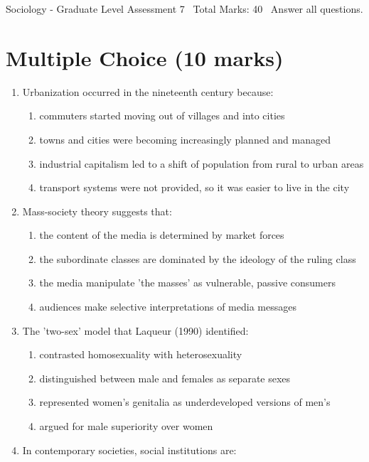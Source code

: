 \documentclass[12pt]{article}
\begin{document}
\begin{center}
Sociology - Graduate Level Assessment 7 \
Total Marks: 40 \
Answer all questions.
\end{center}

\section*{Multiple Choice (10 marks)}
\begin{enumerate}[label=\arabic*.]
\item Urbanization occurred in the nineteenth century because:
\begin{enumerate}[label=(\alph*)]
    \item commuters started moving out of villages and into cities
    \item towns and cities were becoming increasingly planned and managed
    \item industrial capitalism led to a shift of population from rural to urban areas
    \item transport systems were not provided, so it was easier to live in the city
\end{enumerate}
\item Mass-society theory suggests that:
\begin{enumerate}[label=(\alph*)]
    \item the content of the media is determined by market forces
    \item the subordinate classes are dominated by the ideology of the ruling class
    \item the media manipulate 'the masses' as vulnerable, passive consumers
    \item audiences make selective interpretations of media messages
\end{enumerate}
\item The 'two-sex' model that Laqueur (1990) identified:
\begin{enumerate}[label=(\alph*)]
    \item contrasted homosexuality with heterosexuality
    \item distinguished between male and females as separate sexes
    \item represented women's genitalia as underdeveloped versions of men's
    \item argued for male superiority over women
\end{enumerate}
\item In contemporary societies, social institutions are:

\end{enumerate}
\end{document}
